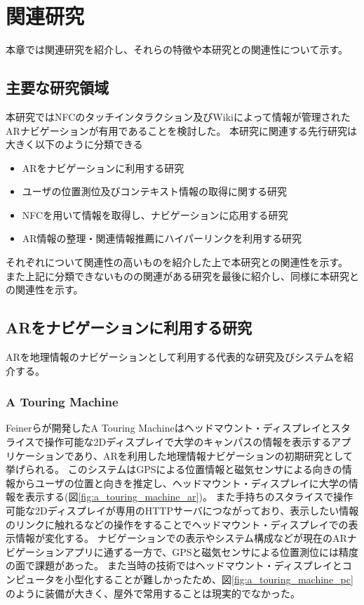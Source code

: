 \chapter{関連研究}
\label{chap:relatedResearch}

本章では関連研究を紹介し、それらの特徴や本研究との関連性について示す。

\newpage


\section{主要な研究領域}
本研究ではNFCのタッチインタラクション及びWikiによって情報が管理されたARナビゲーションが有用であることを検討した。
本研究に関連する先行研究は大きく以下のように分類できる
\begin{itemize}
  \item ARをナビゲーションに利用する研究
  \item ユーザの位置測位及びコンテキスト情報の取得に関する研究
  \item NFCを用いて情報を取得し、ナビゲーションに応用する研究
  \item AR情報の整理・関連情報推薦にハイパーリンクを利用する研究
\end{itemize}
それぞれについて関連性の高いものを紹介した上で本研究との関連性を示す。
また上記に分類できないものの関連がある研究を最後に紹介し、同様に本研究との関連性を示す。

\section{ARをナビゲーションに利用する研究}
ARを地理情報のナビゲーションとして利用する代表的な研究及びシステムを紹介する。

\subsection{A Touring Machine}
Feinerらが開発したA Touring Machine\cite{629922}はヘッドマウント・ディスプレイとスタライスで操作可能な2Dディスプレイで大学のキャンパスの情報を表示するアプリケーションであり、ARを利用した地理情報ナビゲーションの初期研究として挙げられる。
このシステムはGPSによる位置情報と磁気センサによる向きの情報からユーザの位置と向きを推定し、ヘッドマウント・ディスプレイに大学の情報を表示する(図\ref{fig:a_touring_machine_ar})。
また手持ちのスタライスで操作可能な2Dディスプレイが専用のHTTPサーバにつながっており、表示したい情報のリンクに触れるなどの操作をすることでヘッドマウント・ディスプレイでの表示情報が変化する。
ナビゲーションでの表示やシステム構成などが現在のARナビゲーションアプリに通ずる一方で、GPSと磁気センサによる位置測位には精度の面で課題があった。
また当時の技術ではヘッドマウント・ディスプレイとコンピュータを小型化することが難しかったため、図\ref{fig:a_touring_machine_pc}のように装備が大きく、屋外で常用することは現実的でなかった。

